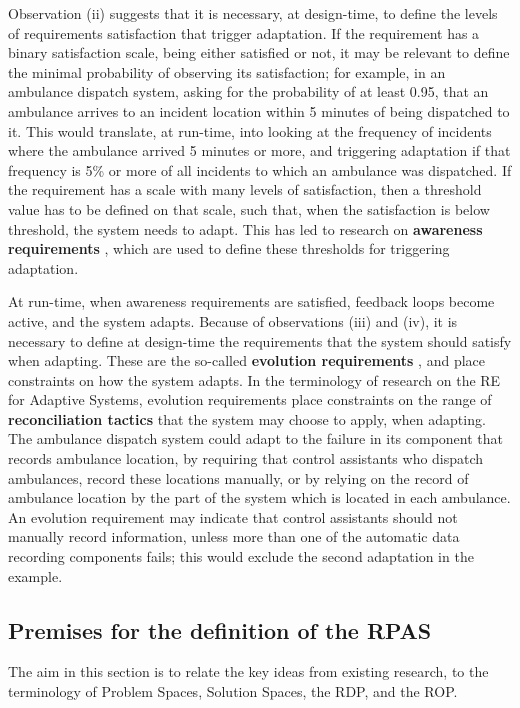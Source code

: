 \documentclass[graybox]{svmult}
\newcommand{\xb}[1]{\textbf{#1}}
\newcommand{\RE}{RE}
\newcommand{\ASfull}{Adaptive System}
\newcommand{\RPAS}{RPAS}
\newcommand{\SolutionSpace}{Solution Space}
\newcommand{\ProblemSpace}{Problem Space}
\newcommand{\ROP}{ROP}
\newcommand{\RDP}{RDP}
\begin{document}
Observation (ii) suggests that it is necessary, at design-time, to define the levels of requirements satisfaction that trigger adaptation. If the requirement has a binary satisfaction scale, being either satisfied or not, it may be relevant to define the minimal probability of observing its satisfaction; for example, in an ambulance dispatch system, asking for the probability of at least 0.95, that an ambulance arrives to an incident location within 5 minutes of being dispatched to it. This would translate, at run-time, into looking at the frequency of incidents where the ambulance arrived 5 minutes or more, and triggering adaptation if that frequency is 5\% or more of all incidents to which an ambulance was dispatched. If the requirement has a scale with many levels of satisfaction, then a threshold value has to be defined on that scale, such that, when the satisfaction is below threshold, the system needs to adapt. This has led to research on \xb{awareness requirements} \cite{souza-et-al:sesas13}, which are used to define these thresholds for triggering adaptation.

At run-time, when awareness requirements are satisfied, feedback loops become active, and the system adapts. Because of observations (iii) and (iv), it is necessary to define at design-time the requirements that the system should satisfy when adapting. These are the so-called \xb{evolution requirements} \cite{Souza+:2012:CSRD}, and place constraints on how the system adapts. In the terminology of research on the \RE{} for \ASfull s, evolution requirements place constraints on the range of \xb{reconciliation tactics} \cite{Fickas+:1995:RE,Feather+:1998:IWSSD,Robinson:2006:REJ} that the system may choose to apply, when adapting. The ambulance dispatch system could adapt to the failure in its component that records ambulance location, by requiring that control assistants who dispatch ambulances, record these locations manually, or by relying on the record of ambulance location by the part of the system which is located in each ambulance. An evolution requirement may indicate that control assistants should not manually record information, unless more than one of the automatic data recording components fails; this would exclude the second adaptation in the example. 


%
\subsection{Premises for the definition of the \RPAS}\label{s:rpas:premises}
The aim in this section is to relate the key ideas from existing research, to the terminology of \ProblemSpace s, \SolutionSpace s, the \RDP, and the \ROP. 
\end{document}
